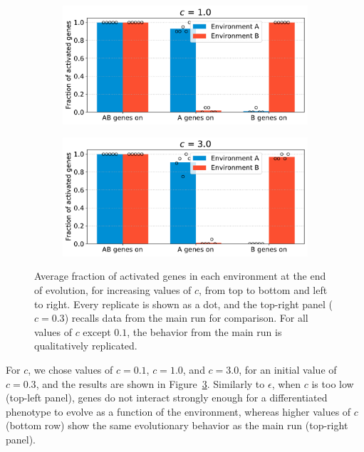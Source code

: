 \begin{figure}[H]
\begin{subfigure}[t]{0.49\textwidth}
\includegraphics[width=\textwidth]{alife/img/mean_activation_inter-coef-1.0.pdf}
\label{subfig:alife:param_c_3}
\end{subfigure}
\begin{subfigure}[t]{0.49\textwidth}
\includegraphics[width=\textwidth]{alife/img/mean_activation_inter-coef-3.0.pdf}
\label{subfig:alife:param_c_4}
\end{subfigure}
\caption[Parameter exploration in the proof-of-concept model: varying $c$]{Average fraction of activated genes in each environment at the end of evolution, for increasing values of $c$, from top to bottom and left to right.
Every replicate is shown as a dot, and the top-right panel ($c = 0.3$) recalls data from the main run for comparison.
For all values of $c$ except $0.1$, the behavior from the main run is qualitatively replicated.}
\label{fig:alife:param_c}
\end{figure}

For $c$, we chose values of $c = 0.1$, $c = 1.0$, and $c = 3.0$, for an initial value of $c = 0.3$, and the results are shown in Figure~\ref{fig:alife:param_c}.
Similarly to $\epsilon$, when $c$ is too low (top-left panel), genes do not interact strongly enough for a differentiated phenotype to evolve as a function of the environment, whereas higher values of $c$ (bottom row) show the same evolutionary behavior as the main run (top-right panel).

